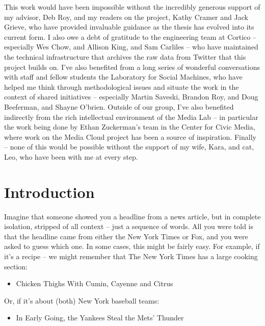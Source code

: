 \documentclass{scrartcl}
\makeatletter
\renewcommand\tableofcontents{%
  \null\hfill\textbf{\Large\contentsname}\hfill\null\par
  \@mkboth{\MakeUppercase\contentsname}{\MakeUppercase\contentsname}%
  \@starttoc{toc}%
}
\makeatother
\begin{document}
This work would have been impossible without the incredibly generous support of my advisor, Deb Roy, and my readers on the project, Kathy Cramer and Jack Grieve, who have provided invaluable guidance as the thesis has evolved into its current form. I also owe a debt of gratitude to the engineering team at Cortico -- especially Wes Chow, and Allison King, and Sam Carliles -- who have maintained the technical infrastructure that archives the raw data from Twitter that this project builds on. I've also benefited from a long series of wonderful conversations with staff and fellow students the Laboratory for Social Machines, who have helped me think through methodological issues and situate the work in the context of shared initiatives -- especially Martin Saveski, Brandon Roy, and Doug Beeferman, and Shayne O'brien. Outside of our group, I've also benefited indirectly from the rich intellectual environment of the Media Lab -- in particular the work being done by Ethan Zuckerman's team in the Center for Civic Media, where work on the Media Cloud project has been a source of inspiration. Finally -- none of this would be possible without the support of my wife, Kara, and cat, Leo, who have been with me at every step.

\newpage
\tableofcontents

\newpage
\section{Introduction}

Imagine that someone showed you a headline from a news article, but in complete isolation, stripped of all context -- just a sequence of words. All you were told is that the headline came from either the New York Times or Fox, and you were asked to guess which one. In some cases, this might be fairly easy. For example, if it's a recipe -- we might remember that The New York Times has a large cooking section:

\begin{itemize}
  \item Chicken Thighs With Cumin, Cayenne and Citrus
\end{itemize}

Or, if it's about (both) New York baseball teams:

\begin{itemize}
  \item In Early Going, the Yankees Steal the Mets' Thunder
\end{itemize}
\end{document}

